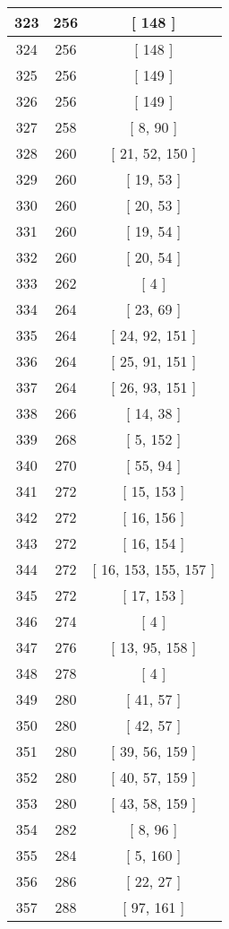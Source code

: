 \begin{center}
\begin{longtable}[H]{|| c c c ||}
\hline
323 & 256 & [ 148 ] \\ 
\hline
324 & 256 & [ 148 ] \\ 
\hline
325 & 256 & [ 149 ] \\ 
\hline
326 & 256 & [ 149 ] \\ 
\hline
327 & 258 & [ 8, 90 ] \\ 
\hline
328 & 260 & [ 21, 52, 150 ] \\ 
\hline
329 & 260 & [ 19, 53 ] \\ 
\hline
330 & 260 & [ 20, 53 ] \\ 
\hline
331 & 260 & [ 19, 54 ] \\ 
\hline
332 & 260 & [ 20, 54 ] \\ 
\hline
333 & 262 & [ 4 ] \\ 
\hline
334 & 264 & [ 23, 69 ] \\ 
\hline
335 & 264 & [ 24, 92, 151 ] \\ 
\hline
336 & 264 & [ 25, 91, 151 ] \\ 
\hline
337 & 264 & [ 26, 93, 151 ] \\ 
\hline
338 & 266 & [ 14, 38 ] \\ 
\hline
339 & 268 & [ 5, 152 ] \\ 
\hline
340 & 270 & [ 55, 94 ] \\ 
\hline
341 & 272 & [ 15, 153 ] \\ 
\hline
342 & 272 & [ 16, 156 ] \\ 
\hline
343 & 272 & [ 16, 154 ] \\ 
\hline
344 & 272 & [ 16, 153, 155, 157 ] \\ 
\hline
345 & 272 & [ 17, 153 ] \\ 
\hline
346 & 274 & [ 4 ] \\ 
\hline
347 & 276 & [ 13, 95, 158 ] \\ 
\hline
348 & 278 & [ 4 ] \\ 
\hline
349 & 280 & [ 41, 57 ] \\ 
\hline
350 & 280 & [ 42, 57 ] \\ 
\hline
351 & 280 & [ 39, 56, 159 ] \\ 
\hline
352 & 280 & [ 40, 57, 159 ] \\ 
\hline
353 & 280 & [ 43, 58, 159 ] \\ 
\hline
354 & 282 & [ 8, 96 ] \\ 
\hline
355 & 284 & [ 5, 160 ] \\ 
\hline
356 & 286 & [ 22, 27 ] \\ 
\hline
357 & 288 & [ 97, 161 ] \\ 

\end{longtable}
\end{center}
